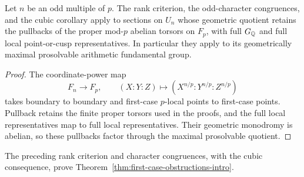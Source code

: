 \begin{corollary}\label{cor:irreg-multiples}
Let \(n\) be an odd multiple of \(p\). The rank criterion, the
odd-character congruences, and the cubic corollary apply to sections
on \(U_n\) whose geometric quotient retains the pullbacks of the
proper mod-\(p\) abelian torsors on \(F_p\), with full \(G_\mathbb Q\) and
full local point-or-cusp representatives. In particular they apply
to its geometrically maximal prosolvable arithmetic fundamental
group.
\end{corollary}

\begin{proof}
The coordinate-power map
\[
 F_n\longrightarrow F_p,\qquad
 (X:Y:Z)\longmapsto
 (X^{n/p}:Y^{n/p}:Z^{n/p})
\]
takes boundary to boundary and first-case \(p\)-local points to
first-case points. Pullback retains the finite proper torsors used
in the proofs, and the full local representatives map to full
local representatives. Their geometric monodromy is abelian, so
these pullbacks factor through the maximal prosolvable quotient.
\end{proof}


The preceding rank criterion and character congruences, with the
cubic consequence, prove
Theorem~\ref{thm:first-case-obstructions-intro}.
